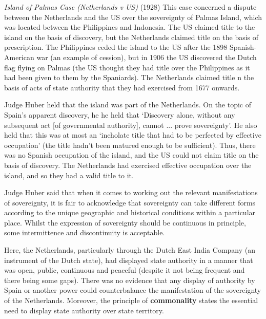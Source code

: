 \begin{casedetails}{\textit{Island of Palmas Case (Netherlands v US)} (1928)}
    \flushleft
    This case concerned a dispute between the Netherlands and the US over the sovereignty of Palmas Island, which was located between the Philippines and Indonesia. The US claimed title to the island on the basis of discovery, but the Netherlands claimed title on the basis of prescription. The Philippines ceded the island to the US after the 1898 Spanish-American war (an example of cession), but in 1906 the US discovered the Dutch flag flying on Palmas (the US thought they had title over the Philippines as it had been given to them by the Spaniards). The Netherlands claimed title n the basis of acts of state authority that they had exercised from 1677 onwards.

    \vspace{\baselineskip}

    Judge Huber held that the island was part of the Netherlands. On the topic of Spain's apparent discovery, he he held that `Discovery alone, without any subsequent act [of governmental authority], cannot ... prove sovereignty'. He also held that this was at most an `incholate title that had to be perfected by effective occupation' (the title hadn't been matured enough to be sufficient). Thus, there was no Spanish occupation of the island, and the US could not claim title on the basis of discovery. The Netherlands had exercised effective occupation over the island, and so they had a valid title to it.

    \vspace{\baselineskip}

    Judge Huber said that when it comes to working out the relevant manifestations of sovereignty, it is fair to acknowledge that sovereignty can take different forms according to the unique geographic and historical conditions within a particular place. Whilst the expression of sovereignty should be continuous in principle, some intermittence and discontinuity is acceptable.

    \vspace{\baselineskip}

    Here, the Netherlands, particularly through the Dutch East India Company (an instrument of the Dutch state), had displayed state authority in a manner that was open, public, continuous and peaceful (despite it not being frequent and there being some gaps). There was no evidence that any display of authority by Spain or another power could counterbalance the manifestation of the sovereignty of the Netherlands. Moreover, the principle of \textbf{commonality} states the essential need to display state authority over state territory.


\end{casedetails}
